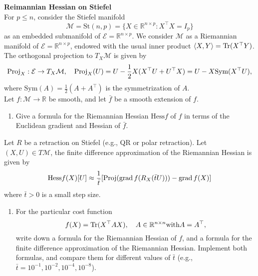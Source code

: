 \documentclass[en, oneside]{assignment}
\begin{document}
\begin{prob} \textbf{Reimannian Hessian on Stiefel}\\
    For $p \leq n$, consider the Stiefel manifold
    \begin{equation*}
        \mathcal{M} = \text{St}(n,p) = \{X \in \mathbb{R}^{n \times p} : X^\top X = I_p\}
    \end{equation*}
    as an embedded submanifold of $\mathcal{E} = \mathbb{R}^{n \times p}$. 
    We consider $\mathcal{M}$ as a Riemannian manifold of $\mathcal{E} = \mathbb{R}^{n \times p}$, 
    endowed with the usual inner product $\langle X, Y \rangle = \operatorname{Tr} (X^\top Y)$.\\
    The orthogonal projection to $T_X\mathcal{M}$ is given by
    \begin{equation*}
        \operatorname{Proj}_X: \mathcal{E} \to T_X\mathcal{M}, \quad \operatorname{Proj}_X(U) = U - \frac{1}{2} X (X^\top U + U^\top X) = U - X \text{Sym}(X^\top U),
    \end{equation*}
    where $\text{Sym}(A) = \frac{1}{2}(A + A^\top)$ is the symmetrization of $A$.\\
    Let $f: \mathcal{M} \to \mathbb{R}$ be smooth, and let $\bar{f}$ be a smooth extension of $f$.
    \begin{enumerate}[label=(\arabic*)]
        \item Give a formula for the Riemannian Hessian $\text{Hess}f$ of $f$ in terms of the Euclidean gradient and Hessian of $\bar{f}$.
    \end{enumerate}
    Let $R$ be a retraction on Stiefel (e.g., QR or polar retraction). Let $(X, U) \in T\mathcal{M}$, 
    the finite difference approximation of the Riemannian Hessian is given by
    \begin{equation*}
        \text{Hess}f(X)[U] \approx \frac{1}{\bar t} [\operatorname{Proj} (\operatorname{grad} f (R_X(\bar t U))) - \operatorname{grad} f(X)]
    \end{equation*}
    where $\bar t > 0$ is a small step size.
    \begin{enumerate}[label=(\arabic*), resume]
        \item For the particular cost function
        \begin{equation*}
            f(X) = \operatorname{Tr} (X^\top A X), \quad A \in \mathbb{R}^{n \times n} \text{with} A = A^\top,
        \end{equation*}
        write down a formula for the Riemannian Hessian of $f$, and a formula for the finite difference approximation of the Riemannian Hessian.
        Implement both formulas, and compare them for different values of $\bar{t}$ (e.g., $\bar{t} = 10^{-1}, 10^{-2}, 10^{-4}, 10^{-8}$).
    \end{enumerate}
\end{prob}
\end{document}
